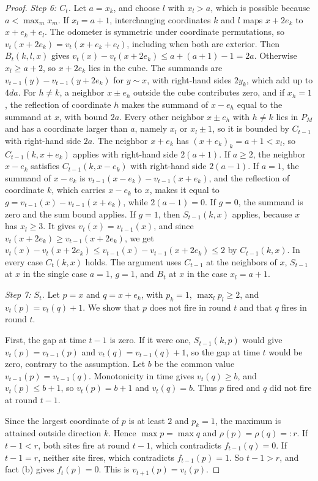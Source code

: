 \documentclass[12pt]{amsart}
\begin{document}
\begin{proof}
\emph{Step 6: $C_t$.} Let $a=x_k$, and choose $l$ with $x_l>a$, which is possible because $a<\max_m x_m$. If $x_l=a+1$, interchanging coordinates $k$ and $l$ maps $x+2e_k$ to $x+e_k+e_l$. The odometer is symmetric under coordinate permutations, so $v_t(x+2e_k)=v_t(x+e_k+e_l)$, including when both are exterior. Then $B_t(k,l,x)$ gives $v_t(x)-v_t(x+2e_k)\leq a+(a+1)-1=2a$. Otherwise $x_l\geq a+2$, so $x+2e_k$ lies in the cube. The summands are $v_{t-1}(y)-v_{t-1}(y+2e_k)$ for $y\sim x$, with right-hand sides $2y_k$, which add up to $4da$. For $h\neq k$, a neighbor $x\pm e_h$ outside the cube contributes zero, and if $x_h=1$, the reflection of coordinate $h$ makes the summand of $x-e_h$ equal to the summand at $x$, with bound $2a$. Every other neighbor $x\pm e_h$ with $h\neq k$ lies in $P_M$ and has a coordinate larger than $a$, namely $x_l$ or $x_l\pm1$, so it is bounded by $C_{t-1}$ with right-hand side $2a$. The neighbor $x+e_k$ has $(x+e_k)_k=a+1<x_l$, so $C_{t-1}(k,x+e_k)$ applies with right-hand side $2(a+1)$. If $a\geq2$, the neighbor $x-e_k$ satisfies $C_{t-1}(k,x-e_k)$ with right-hand side $2(a-1)$. If $a=1$, the summand of $x-e_k$ is $v_{t-1}(x-e_k)-v_{t-1}(x+e_k)$, and the reflection of coordinate $k$, which carries $x-e_k$ to $x$, makes it equal to $g=v_{t-1}(x)-v_{t-1}(x+e_k)$, while $2(a-1)=0$. If $g=0$, the summand is zero and the sum bound applies. If $g=1$, then $S_{t-1}(k,x)$ applies, because $x$ has $x_l\geq3$. It gives $v_t(x)=v_{t-1}(x)$, and since $v_t(x+2e_k)\geq v_{t-1}(x+2e_k)$, we get $v_t(x)-v_t(x+2e_k)\leq v_{t-1}(x)-v_{t-1}(x+2e_k)\leq 2$ by $C_{t-1}(k,x)$. In every case $C_t(k,x)$ holds. The argument uses $C_{t-1}$ at the neighbors of $x$, $S_{t-1}$ at $x$ in the single case $a=1$, $g=1$, and $B_t$ at $x$ in the case $x_l=a+1$.

\emph{Step 7: $S_t$.} Let $p=x$ and $q=x+e_k$, with $p_k=1$, $\max_l p_l\geq2$, and $v_t(p)=v_t(q)+1$. We show that $p$ does not fire in round $t$ and that $q$ fires in round $t$.

First, the gap at time $t-1$ is zero. If it were one, $S_{t-1}(k,p)$ would give $v_t(p)=v_{t-1}(p)$ and $v_t(q)=v_{t-1}(q)+1$, so the gap at time $t$ would be zero, contrary to the assumption. Let $b$ be the common value $v_{t-1}(p)=v_{t-1}(q)$. Monotonicity in time gives $v_t(q)\geq b$, and $v_t(p)\leq b+1$, so $v_t(p)=b+1$ and $v_t(q)=b$. Thus $p$ fired and $q$ did not fire at round $t-1$.

Since the largest coordinate of $p$ is at least $2$ and $p_k=1$, the maximum is attained outside direction $k$. Hence $\max p=\max q$ and $\rho(p)=\rho(q)=:r$. If $t-1<r$, both sites fire at round $t-1$, which contradicts $f_{t-1}(q)=0$. If $t-1=r$, neither site fires, which contradicts $f_{t-1}(p)=1$. So $t-1>r$, and fact (b) gives $f_t(p)=0$. This is $v_{t+1}(p)=v_t(p)$.


\end{proof}
\end{document}
